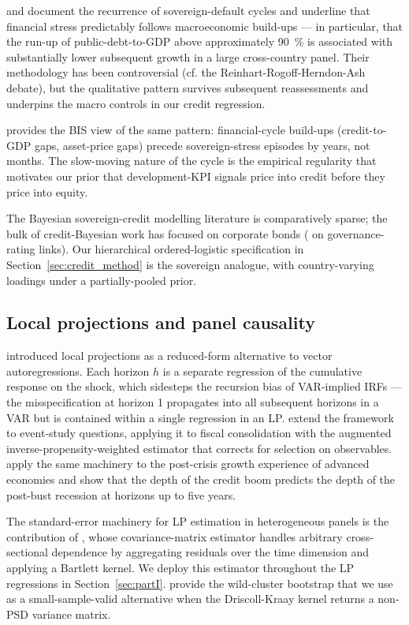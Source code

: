 \textcite{reinhart_rogoff2009} and \textcite{reinhart_rogoff2010} document the recurrence of sovereign-default cycles and underline that financial stress predictably follows macroeconomic build-ups --- in particular, that the run-up of public-debt-to-GDP above approximately 90~\% is associated with substantially lower subsequent growth in a large cross-country panel. Their methodology has been controversial (cf. the Reinhart-Rogoff-Herndon-Ash debate), but the qualitative pattern survives subsequent reassessments and underpins the macro controls in our credit regression.

\textcite{borio2014bispaper} provides the BIS view of the same pattern: financial-cycle build-ups (credit-to-GDP gaps, asset-price gaps) precede sovereign-stress episodes by years, not months. The slow-moving nature of the cycle is the empirical regularity that motivates our prior that development-KPI signals price into credit before they price into equity.

The Bayesian sovereign-credit modelling literature is comparatively sparse; the bulk of credit-Bayesian work has focused on corporate bonds (\cite{bhojrajsengupta2003} on governance-rating links). Our hierarchical ordered-logistic specification in Section~\ref{sec:credit_method} is the sovereign analogue, with country-varying loadings under a partially-pooled prior.

\subsection{Local projections and panel causality}

\textcite{jorda2005} introduced local projections as a reduced-form alternative to vector autoregressions. Each horizon $h$ is a separate regression of the cumulative response on the shock, which sidesteps the recursion bias of VAR-implied IRFs --- the misspecification at horizon 1 propagates into all subsequent horizons in a VAR but is contained within a single regression in an LP. \textcite{jordataylor2016} extend the framework to event-study questions, applying it to fiscal consolidation with the augmented inverse-propensity-weighted estimator that corrects for selection on observables. \textcite{jordaschulariktaylor2013} apply the same machinery to the post-crisis growth experience of advanced economies and show that the depth of the credit boom predicts the depth of the post-bust recession at horizons up to five years.

The standard-error machinery for LP estimation in heterogeneous panels is the contribution of \textcite{driscollkraay1998}, whose covariance-matrix estimator handles arbitrary cross-sectional dependence by aggregating residuals over the time dimension and applying a Bartlett kernel. We deploy this estimator throughout the LP regressions in Section~\ref{sec:partI}. \textcite{cameronetal2008wildbootstrap} provide the wild-cluster bootstrap that we use as a small-sample-valid alternative when the Driscoll-Kraay kernel returns a non-PSD variance matrix.

